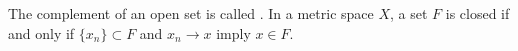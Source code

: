 The complement of an open set is called . In a metric space $X$, a set $F$ is closed if and only if $\{x_n\} \subset F$ and $x_n \to x$ imply $x \in F$.
